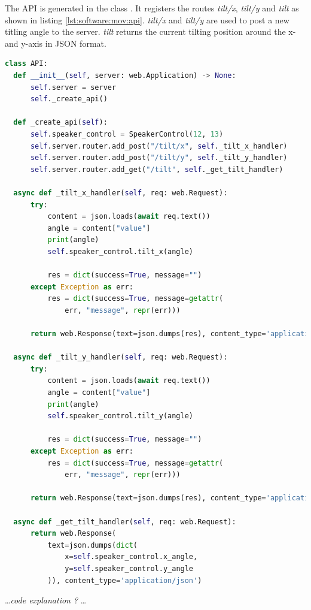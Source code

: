The API is generated in the class . It registers the routes \textit{tilt/x}, \textit{tilt/y} and \textit{tilt} as shown in listing \ref{lst:software:mov:api}.
\textit{tilt/x} and \textit{tilt/y} are used to post a new titling angle to the server. \textit{tilt} returns the current tilting position around the x- and y-axis in JSON format.\p
%
\begin{mdframed}
\begin{lstlisting}[language=Python, caption=Control interface API, label=lst:software:mov:api]
class API:
  def __init__(self, server: web.Application) -> None:
      self.server = server
      self._create_api()

  def _create_api(self):
      self.speaker_control = SpeakerControl(12, 13)
      self.server.router.add_post("/tilt/x", self._tilt_x_handler)
      self.server.router.add_post("/tilt/y", self._tilt_y_handler)
      self.server.router.add_get("/tilt", self._get_tilt_handler)

  async def _tilt_x_handler(self, req: web.Request):
      try:
          content = json.loads(await req.text())
          angle = content["value"]
          print(angle)
          self.speaker_control.tilt_x(angle)

          res = dict(success=True, message="")
      except Exception as err:
          res = dict(success=True, message=getattr(
              err, "message", repr(err)))

      return web.Response(text=json.dumps(res), content_type='application/json')

  async def _tilt_y_handler(self, req: web.Request):
      try:
          content = json.loads(await req.text())
          angle = content["value"]
          print(angle)
          self.speaker_control.tilt_y(angle)

          res = dict(success=True, message="")
      except Exception as err:
          res = dict(success=True, message=getattr(
              err, "message", repr(err)))

      return web.Response(text=json.dumps(res), content_type='application/json')

  async def _get_tilt_handler(self, req: web.Request):
      return web.Response(
          text=json.dumps(dict(
              x=self.speaker_control.x_angle,
              y=self.speaker_control.y_angle
          )), content_type='application/json')
\end{lstlisting}
\end{mdframed}
\dots \textit{code explanation ?} \dots\p

